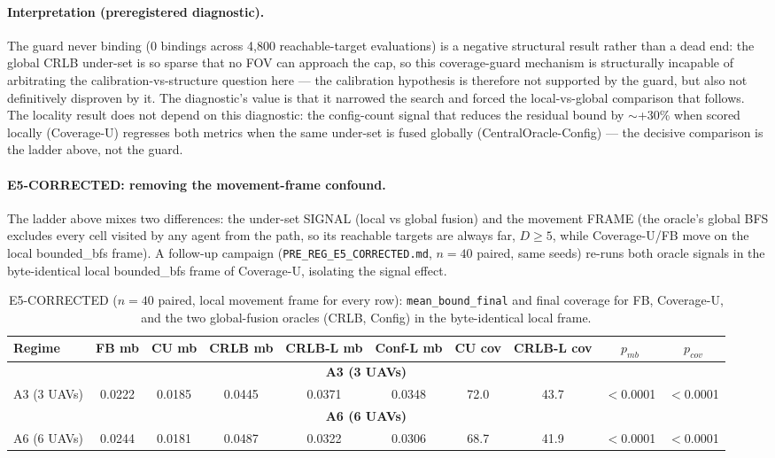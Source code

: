 \documentclass[journal]{IEEEtran}
\newcommand{\CU}{Coverage-U}
\begin{document}
\paragraph{Interpretation (preregistered diagnostic).}
The guard never binding (0 bindings across 4{,}800 reachable-target
evaluations) is a negative structural result rather than a dead end: the global
CRLB under-set is so sparse that no FOV can approach the cap, so this
coverage-guard mechanism is structurally incapable of arbitrating the
calibration-vs-structure question here --- the calibration hypothesis is
therefore not supported by the guard, but also not definitively disproven by
it. The diagnostic's value is that it narrowed the search and forced the
local-vs-global comparison that follows. The locality result does not depend on
this diagnostic: the config-count signal that reduces the residual bound by
$\sim$+30\% when scored locally (\CU) regresses both metrics when the same
under-set is fused globally (CentralOracle-Config) --- the decisive comparison
is the ladder above, not the guard.

\paragraph{E5-CORRECTED: removing the movement-frame confound.}
The ladder above mixes two differences: the under-set SIGNAL (local vs global
fusion) and the movement FRAME (the oracle's global BFS excludes every cell
visited by any agent from the path, so its reachable targets are always far,
$D \geq 5$, while \CU/FB move on the local bounded\_bfs frame). A follow-up
campaign (\texttt{PRE\_REG\_E5\_CORRECTED.md}, $n = 40$ paired, same seeds)
re-runs both oracle signals in the byte-identical local bounded\_bfs frame of
\CU, isolating the signal effect.

\begin{table}[t]
\caption{E5-CORRECTED ($n = 40$ paired, local movement frame for every row): \texttt{mean\_bound\_final} and final coverage for FB, \CU, and the two global-fusion oracles (CRLB, Config) in the byte-identical local frame.}
\label{tab:e5corr}
\centering
\begin{tabular}{l c c c c c c c c c}
\toprule
Regime & FB mb & CU mb & CRLB mb & CRLB-L mb & Conf-L mb & CU cov & CRLB-L cov & $p_{mb}$ & $p_{cov}$ \\
\midrule
\multicolumn{10}{c}{\textbf{A3 (3 UAVs)}} \\
\midrule
A3 (3 UAVs) & 0.0222 & 0.0185 & 0.0445 & 0.0371 & 0.0348 & 72.0 & 43.7 & $<$0.0001 & $<$0.0001 \\
\multicolumn{10}{c}{\textbf{A6 (6 UAVs)}} \\
\midrule
A6 (6 UAVs) & 0.0244 & 0.0181 & 0.0487 & 0.0322 & 0.0306 & 68.7 & 41.9 & $<$0.0001 & $<$0.0001 \\
\bottomrule
\end{tabular}
\end{table}
\end{document}
